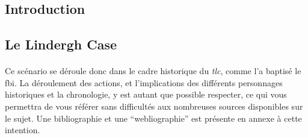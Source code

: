 \subsection{Introduction}
\subsection{Le Lindergh Case}
\paragraph{} Ce scénario se déroule donc dans le cadre historique du \emph{\gls{tlc}}, comme l'a baptisé le
\gls{fbi}. La déroulement des actions, et l'implications des différents personnages historiques et la chronologie, y est 
autant que possible respecter, ce qui vous permettra de vous référer sans difficultés aux nombreuses sources disponibles
sur le sujet. Une bibliographie et une ``webliographie'' est présente en annexe à cette intention.
